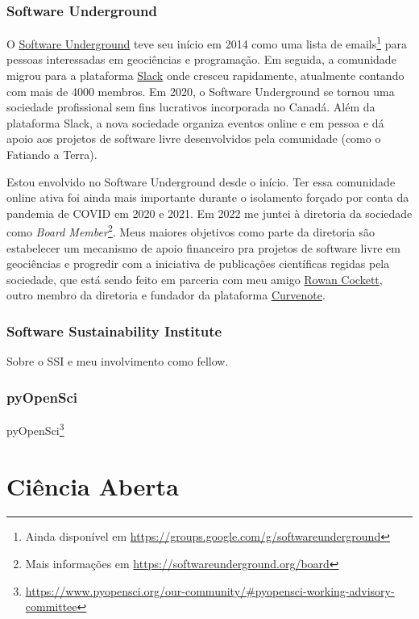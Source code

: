 \documentclass[10pt,a4paper,oneside]{book}
\begin{document}
\subsection{Software Underground}

O \href{https://softwareunderground.org/}{Software Underground} teve seu início
em 2014 como uma lista de
emails\footnote{Ainda disponível em \url{https://groups.google.com/g/softwareunderground}}
para pessoas interessadas em geociências e programação.
Em seguida, a comunidade migrou para a plataforma
\href{https://softwareunderground.org/slack}{Slack} onde cresceu rapidamente,
atualmente contando com mais de 4000 membros.
Em 2020, o Software Underground se tornou uma sociedade profissional sem fins
lucrativos incorporada no Canadá.
Além da plataforma Slack, a nova sociedade organiza eventos online e em pessoa
e dá apoio aos projetos de software livre desenvolvidos pela comunidade
(como o Fatiando a Terra).

Estou envolvido no Software Underground desde o início.
Ter essa comunidade online ativa foi ainda mais importante durante o isolamento
forçado por conta da pandemia de COVID em 2020 e 2021.
Em 2022 me juntei à diretoria da sociedade como
\textit{Board Member}\footnote{Mais informações em \url{https://softwareunderground.org/board}}.
Meus maiores objetivos como parte da diretoria são estabelecer um mecanismo de
apoio financeiro pra projetos de software livre em geociências e progredir com
a iniciativa de publicações científicas regidas pela sociedade, que está sendo
feito em parceria com meu amigo \href{https://row1.ca/}{Rowan Cockett}, outro
membro da diretoria e fundador da plataforma \href{https://curvenote.com/}{Curvenote}.

\subsection{Software Sustainability Institute}

Sobre o SSI e meu involvimento como fellow.

\subsection{pyOpenSci}

pyOpenSci\footnote{\url{https://www.pyopensci.org/our-community/\#pyopensci-working-advisory-committee}}


\chapter{Ciência Aberta}
\label{cap_cienciaaberta}
\end{document}
